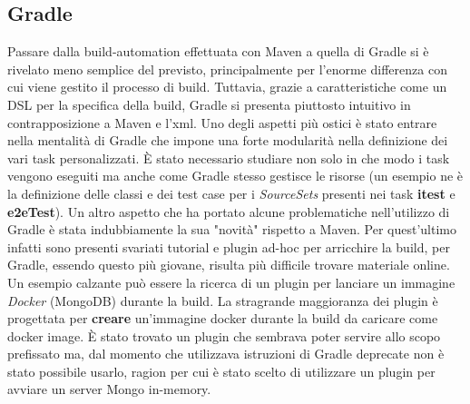 \subsection{Gradle}

Passare dalla build-automation effettuata con Maven a quella di Gradle si è rivelato meno semplice del previsto, principalmente per l'enorme differenza con cui viene gestito il processo di build. Tuttavia, grazie a caratteristiche come un DSL per la specifica della build, Gradle si presenta piuttosto intuitivo in contrapposizione a Maven e l'xml.\newline
Uno degli aspetti più ostici è stato entrare nella mentalità di Gradle che impone una forte modularità nella definizione dei vari task personalizzati. È stato necessario studiare non solo in che modo i task vengono eseguiti ma anche come Gradle stesso gestisce le risorse (un esempio ne è la definizione delle classi e dei test case per i \textsl{SourceSets} presenti nei task \textbf{itest} e \textbf{e2eTest}).\newline\newline
Un altro aspetto che ha portato alcune problematiche nell'utilizzo di Gradle è stata indubbiamente la sua "novità" rispetto a Maven. Per quest'ultimo infatti sono presenti svariati tutorial e plugin ad-hoc per arricchire la build, per Gradle, essendo questo più giovane, risulta più difficile trovare materiale online.\newline
Un esempio calzante può essere la ricerca di un plugin per lanciare un immagine \textsl{Docker} (MongoDB) durante la build. La stragrande maggioranza dei plugin è progettata per \textbf{creare} un'immagine docker durante la build da caricare come docker image. È stato trovato un plugin che sembrava poter servire allo scopo prefissato ma, dal momento che utilizzava istruzioni di Gradle deprecate non è stato possibile usarlo, ragion per cui è stato scelto di utilizzare un plugin per avviare un server Mongo in-memory.
